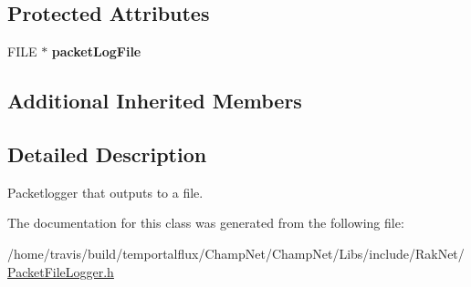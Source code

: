 \subsection*{Protected Attributes}
\begin{DoxyCompactItemize}
\item 
\hypertarget{class_rak_net_1_1_packet_file_logger_adc584214d93307d2dae5490834ed5f6f}{F\-I\-L\-E $\ast$ {\bfseries packet\-Log\-File}}\label{class_rak_net_1_1_packet_file_logger_adc584214d93307d2dae5490834ed5f6f}

\end{DoxyCompactItemize}
\subsection*{Additional Inherited Members}


\subsection{Detailed Description}
Packetlogger that outputs to a file. 

The documentation for this class was generated from the following file\-:\begin{DoxyCompactItemize}
\item 
/home/travis/build/temportalflux/\-Champ\-Net/\-Champ\-Net/\-Libs/include/\-Rak\-Net/\hyperlink{_packet_file_logger_8h}{Packet\-File\-Logger.\-h}\end{DoxyCompactItemize}
